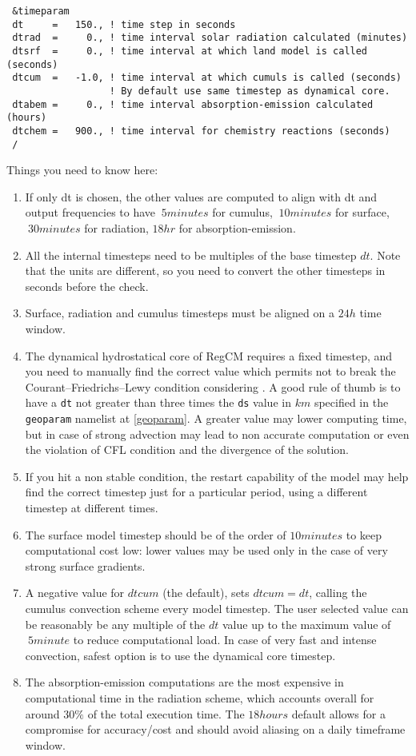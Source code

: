 {\footnotesize
\begin{Verbatim}
 &timeparam
 dt     =   150., ! time step in seconds
 dtrad  =     0., ! time interval solar radiation calculated (minutes)
 dtsrf  =     0., ! time interval at which land model is called (seconds)
 dtcum  =   -1.0, ! time interval at which cumuls is called (seconds)
                  ! By default use same timestep as dynamical core.
 dtabem =     0., ! time interval absorption-emission calculated (hours)
 dtchem =   900., ! time interval for chemistry reactions (seconds)
 /
\end{Verbatim}
}

Things you need to know here:

\begin{enumerate}
\item If only dt is chosen, the other values are computed to align with dt
and output frequencies to have $~5minutes$ for cumulus, $~10minutes$ for
surface, $~30 minutes$ for radiation, $18hr$ for absorption-emission.
\item All the internal timesteps need to be multiples of the base
timestep $dt$.  Note that the units are different, so you need to convert the
other timesteps in seconds before the check.
\item Surface, radiation and cumulus timesteps must be aligned on a $24h$
time window.
\item The dynamical hydrostatical core of RegCM requires a fixed timestep,
and you need to manually find the correct value which permits not to break
the Courant–Friedrichs–Lewy condition considering \cite{CFL}.
A good rule of thumb is to have a \verb=dt= not greater than three times
the \verb=ds= value in $km$ specified in the \verb=geoparam= namelist at
\ref{geoparam}.
A greater value may lower computing time, but in case of strong advection
may lead to non accurate computation or even the violation of CFL condition
and the divergence of the solution.
\item If you hit a non stable condition, the restart capability of the model
may help find the correct timestep just for a particular period, using a
different timestep at different times.
\item The surface model timestep should be of the order of $10 minutes$ to
keep computational cost low: lower values may be used only in the case of
very strong surface gradients.
\item A negative value for $dtcum$ (the default), sets $dtcum = dt$,
calling the cumulus convection scheme every model timestep. The user selected
value can be reasonably be any multiple of the $dt$ value up to the
maximum value of $~5minute$ to reduce computational load.
In case of very fast and intense convection, safest option is to use the
dynamical core timestep.
\item The absorption-emission computations are the most expensive in
computational time in the radiation scheme, which accounts overall for
around $30\%$ of the total execution time. The $18 hours$ default
allows for a compromise for accuracy/cost and should avoid aliasing on a
daily timeframe window.
\end{enumerate}

